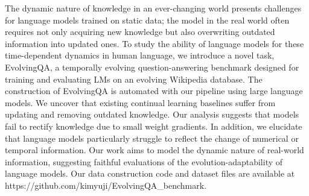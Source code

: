 The dynamic nature of knowledge in an ever-changing world presents challenges for language models trained on static data; the model in the real world often requires not only acquiring new knowledge but also overwriting outdated information into updated ones. To study the ability of language models for these time-dependent dynamics in human language, we introduce a novel task, EvolvingQA, a temporally evolving question-answering benchmark designed for training and evaluating LMs on an evolving Wikipedia database. The construction of EvolvingQA is automated with our pipeline using large language models. We uncover that existing continual learning baselines suffer from updating and removing outdated knowledge. Our analysis suggests that models fail to rectify knowledge due to small weight gradients. In addition, we elucidate that language models particularly struggle to reflect the change of numerical or temporal information. Our work aims to model the dynamic nature of real-world information, suggesting faithful evaluations of the evolution-adaptability of language models. Our data construction code and dataset files are available at https://github.com/kimyuji/EvolvingQA\_benchmark.